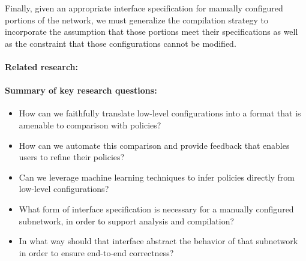 Finally, given an appropriate interface specification for manually configured portions of the network, we must generalize the \Name compilation strategy to incorporate the assumption that those portions meet their specifications as well as the constraint that those configurations cannot be modified.


\paragraph*{Related research:}  


\paragraph*{Summary of key research questions:}

\begin{itemize}
\item How can we faithfully translate low-level configurations into a format that is amenable to comparison with \Name policies?

\item How can we automate this comparison and provide feedback that enables users to refine their policies?

\item Can we leverage machine learning techniques to infer \Name policies directly from low-level configurations?

\item What form of interface specification is necessary for a manually configured subnetwork, in order to support \Name analysis and compilation?

\item In what way should that interface abstract the behavior of that subnetwork in order to ensure end-to-end correctness?

\end{itemize}


